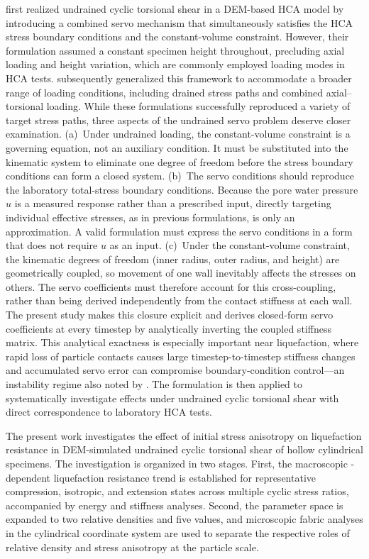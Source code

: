 \citet{Han2024jgs} first realized undrained cyclic torsional shear in a DEM-based HCA model by introducing a combined servo mechanism that simultaneously satisfies the HCA stress boundary conditions and the constant-volume constraint. However, their formulation assumed a constant specimen height throughout, precluding axial loading and height variation, which are commonly employed loading modes in HCA tests. \citet{Ma2024} subsequently generalized this framework to accommodate a broader range of loading conditions, including drained stress paths and combined axial--torsional loading. While these formulations successfully reproduced a variety of target stress paths, three aspects of the undrained servo problem deserve closer examination.
(a)~Under undrained loading, the constant-volume constraint is a governing equation, not an auxiliary condition. It must be substituted into the kinematic system to eliminate one degree of freedom before the stress boundary conditions can form a closed system.
(b)~The servo conditions should reproduce the laboratory total-stress boundary conditions. Because the pore water pressure $u$ is a measured response rather than a prescribed input, directly targeting individual effective stresses, as in previous formulations, is only an approximation. A valid formulation must express the servo conditions in a form that does not require $u$ as an input.
(c)~Under the constant-volume constraint, the kinematic degrees of freedom (inner radius, outer radius, and height) are geometrically coupled, so movement of one wall inevitably affects the stresses on others. The servo coefficients must therefore account for this cross-coupling, rather than being derived independently from the contact stiffness at each wall.
The present study makes this closure explicit and derives closed-form servo coefficients at every timestep by analytically inverting the coupled stiffness matrix. This analytical exactness is especially important near liquefaction, where rapid loss of particle contacts causes large timestep-to-timestep stiffness changes and accumulated servo error can compromise boundary-condition control---an instability regime also noted by \citet{Ma2024}. The formulation is then applied to systematically investigate \Kzero{} effects under undrained cyclic torsional shear with direct correspondence to laboratory HCA tests.

The present work investigates the effect of initial stress anisotropy on liquefaction resistance in DEM-simulated undrained cyclic torsional shear of hollow cylindrical specimens. The investigation is organized in two stages. First, the macroscopic \Kzero{}-dependent liquefaction resistance trend is established for representative compression, isotropic, and extension states across multiple cyclic stress ratios, accompanied by energy and stiffness analyses. Second, the parameter space is expanded to two relative densities and five \Kzero{} values, and microscopic fabric analyses in the cylindrical coordinate system are used to separate the respective roles of relative density and stress anisotropy at the particle scale.

